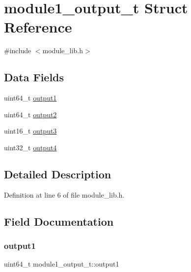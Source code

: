 \hypertarget{structmodule1__output__t}{}\section{module1\+\_\+output\+\_\+t Struct Reference}
\label{structmodule1__output__t}


{\ttfamily \#include $<$module\+\_\+lib.\+h$>$}

\subsection*{Data Fields}
\begin{DoxyCompactItemize}
\item 
uint64\+\_\+t \hyperlink{structmodule1__output__t_a0c77de7dd24c1ce2b4c5cc5083c6227c}{output1}
\item 
uint64\+\_\+t \hyperlink{structmodule1__output__t_a4e931afd78a7f9d8cf38c9684c185d6e}{output2}
\item 
uint16\+\_\+t \hyperlink{structmodule1__output__t_ade7d350de705d80df997b2f54bbf8991}{output3}
\item 
uint32\+\_\+t \hyperlink{structmodule1__output__t_a872f87bd41744bcf8471ac43108b39bf}{output4}
\end{DoxyCompactItemize}


\subsection{Detailed Description}


Definition at line 6 of file module\+\_\+lib.\+h.



\subsection{Field Documentation}
\mbox{\label{structmodule1__output__t_a0c77de7dd24c1ce2b4c5cc5083c6227c}} 
\subsubsection{\texorpdfstring{output1}{output1}}
{\footnotesize\ttfamily uint64\+\_\+t module1\+\_\+output\+\_\+t\+::output1}



